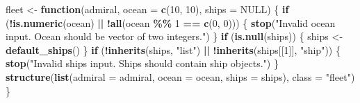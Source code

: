 \documentclass[
]{article}
\newenvironment{Shaded}{\begin{snugshade}}{\end{snugshade}}
\newcommand{\AttributeTok}[1]{\textcolor[rgb]{0.13,0.29,0.53}{#1}}
\newcommand{\ConstantTok}[1]{\textcolor[rgb]{0.56,0.35,0.01}{#1}}
\newcommand{\ControlFlowTok}[1]{\textcolor[rgb]{0.13,0.29,0.53}{\textbf{#1}}}
\newcommand{\DecValTok}[1]{\textcolor[rgb]{0.00,0.00,0.81}{#1}}
\newcommand{\FunctionTok}[1]{\textcolor[rgb]{0.13,0.29,0.53}{\textbf{#1}}}
\newcommand{\NormalTok}[1]{#1}
\newcommand{\OtherTok}[1]{\textcolor[rgb]{0.56,0.35,0.01}{#1}}
\newcommand{\SpecialCharTok}[1]{\textcolor[rgb]{0.81,0.36,0.00}{\textbf{#1}}}
\newcommand{\StringTok}[1]{\textcolor[rgb]{0.31,0.60,0.02}{#1}}
\begin{document}
\begin{Shaded}
\begin{Highlighting}[]
\NormalTok{fleet }\OtherTok{\textless{}{-}} \ControlFlowTok{function}\NormalTok{(admiral, }\AttributeTok{ocean =} \FunctionTok{c}\NormalTok{(}\DecValTok{10}\NormalTok{, }\DecValTok{10}\NormalTok{), }\AttributeTok{ships =} \ConstantTok{NULL}\NormalTok{) \{ }
  \ControlFlowTok{if}\NormalTok{ (}\SpecialCharTok{!}\FunctionTok{is.numeric}\NormalTok{(ocean) }\SpecialCharTok{||} \SpecialCharTok{!}\FunctionTok{all}\NormalTok{(ocean }\SpecialCharTok{\%\%} \DecValTok{1} \SpecialCharTok{==} \FunctionTok{c}\NormalTok{(}\DecValTok{0}\NormalTok{, }\DecValTok{0}\NormalTok{))) \{}
    \FunctionTok{stop}\NormalTok{(}\StringTok{"Invalid ocean input. Ocean should be vector of two integers."}\NormalTok{)}
\NormalTok{  \}}
  \ControlFlowTok{if}\NormalTok{ (}\FunctionTok{is.null}\NormalTok{(ships)) \{}
\NormalTok{    ships }\OtherTok{\textless{}{-}} \FunctionTok{default\_ships}\NormalTok{()}
\NormalTok{  \}}
  \ControlFlowTok{if}\NormalTok{ (}\SpecialCharTok{!}\FunctionTok{inherits}\NormalTok{(ships, }\StringTok{"list"}\NormalTok{) }\SpecialCharTok{||} \SpecialCharTok{!}\FunctionTok{inherits}\NormalTok{(ships[[}\DecValTok{1}\NormalTok{]], }\StringTok{"ship"}\NormalTok{)) \{}
    \FunctionTok{stop}\NormalTok{(}\StringTok{"Invalid ships input. Ships should contain ship objects."}\NormalTok{)}
\NormalTok{  \}}
  \FunctionTok{structure}\NormalTok{(}\FunctionTok{list}\NormalTok{(}\AttributeTok{admiral =}\NormalTok{ admiral, }\AttributeTok{ocean =}\NormalTok{ ocean, }\AttributeTok{ships =}\NormalTok{ ships), }\AttributeTok{class =} \StringTok{"fleet"}\NormalTok{)}
\NormalTok{\}}


\end{Highlighting}
\end{Shaded}
\end{document}
